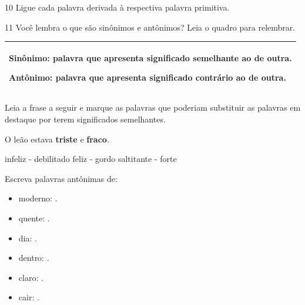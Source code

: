 \num{10} Ligue cada palavra derivada à respectiva palavra primitiva.

\begin{multicols}{2}







\end{multicols}

\pagebreak
\num{11} Você lembra o que são sinônimos e antônimos? Leia o quadro para
relembrar.


\begin{longtable}[]{@{}l@{}}
\toprule
\begin{minipage}[t]{0.97\columnwidth}\raggedright\strut
\textbf{Sinônimo}: palavra que apresenta significado semelhante ao de
outra.

\textbf{Antônimo}: palavra que apresenta significado contrário ao de
outra.
\strut
\end{minipage}\tabularnewline
\bottomrule
\end{longtable}

\begin{escolha}
\item Leia a frase a seguir e marque as palavras que poderiam substituir as
palavras em destaque por terem significados semelhantes.

O leão estava \textbf{triste} e \textbf{fraco}.

\begin{boxlist}
 infeliz - debilitado
 feliz - gordo
 saltitante - forte
\end{boxlist}

\item Escreva palavras antônimas de:

\begin{itemize}
\item
  moderno: .
\item
  quente: .
\item
  dia: .
\item
  dentro: .
\item
  claro: .
\item
  cair: .
\end{itemize}
\end{escolha}

